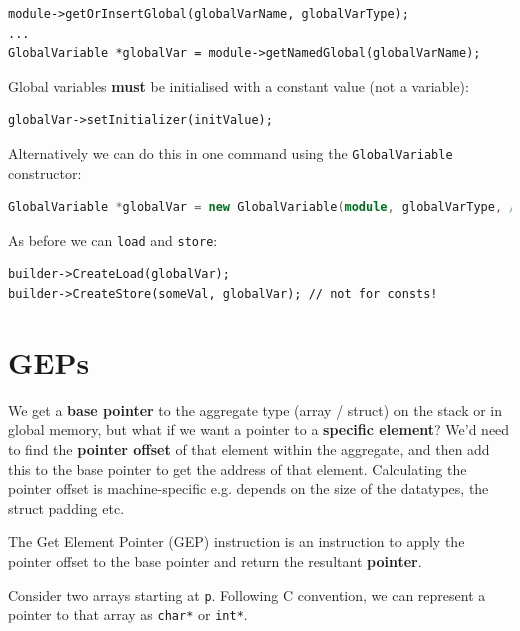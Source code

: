 
\begin{verbatim}
module->getOrInsertGlobal(globalVarName, globalVarType);
...
GlobalVariable *globalVar = module->getNamedGlobal(globalVarName);
\end{verbatim}

Global variables \textbf{must} be initialised with a constant value (not
a variable):


\begin{verbatim}
globalVar->setInitializer(initValue);
\end{verbatim}

Alternatively we can do this in one command using the
\texttt{GlobalVariable} constructor:


\begin{lstlisting}[language=C++]
GlobalVariable *globalVar = new GlobalVariable(module, globalVarType, /*isConstant*/ false,              GlobalValue::ExternalLinkage, initValue, globalVarName)
\end{lstlisting}

As before we can \texttt{load} and \texttt{store}:


\begin{verbatim}
builder->CreateLoad(globalVar);
builder->CreateStore(someVal, globalVar); // not for consts!
\end{verbatim}

\hypertarget{geps}{%
\section{\texorpdfstring{\protect\hyperlink{geps}{}GEPs}{GEPs}}\label{geps}}

We get a \textbf{base pointer} to the aggregate type (array / struct) on
the stack or in global memory, but what if we want a pointer to a
\textbf{specific element}? We'd need to find the \textbf{pointer offset}
of that element within the aggregate, and then add this to the base
pointer to get the address of that element. Calculating the pointer
offset is machine-specific e.g. depends on the size of the datatypes,
the struct padding etc.

The Get Element Pointer (GEP) instruction is an instruction to apply the
pointer offset to the base pointer and return the resultant
\textbf{pointer}.

Consider two arrays starting at \texttt{p}. Following C convention, we
can represent a pointer to that array as \texttt{char*} or
\texttt{int*}.

